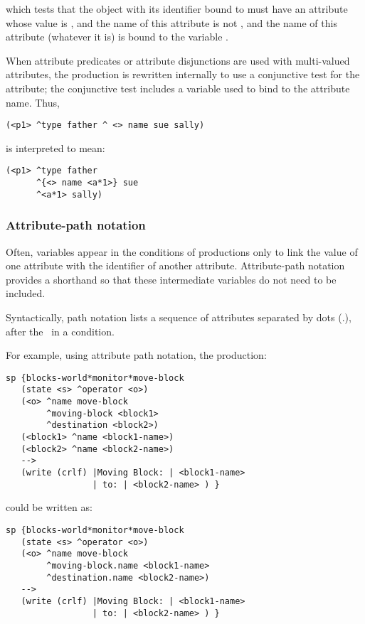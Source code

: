 which tests that the object with its identifier bound to  must have
an attribute whose value is , and the name of this attribute is
not , and the name of this attribute (whatever it is) is bound to
the variable .

When attribute predicates or attribute disjunctions are used with
multi-valued attributes, the production is rewritten internally to use a
conjunctive test for the attribute; the conjunctive test includes a
variable used to bind to the attribute name. Thus,

\begin{verbatim}
(<p1> ^type father ^ <> name sue sally)
\end{verbatim}

is interpreted to mean:

\begin{verbatim}
(<p1> ^type father 
      ^{<> name <a*1>} sue 
      ^<a*1> sally)
\end{verbatim}


\subsubsection{Attribute-path notation}
\label{SYNTAX-pm-path}

Often, variables appear in the conditions of productions only to link the value
of one attribute with the identifier of another attribute. Attribute-path
notation provides a shorthand so that these intermediate variables do not need
to be included.

Syntactically, path notation lists a sequence of attributes separated by dots
(.), after the \carat \ in a condition.

For example, using attribute path notation, the production:

\begin{verbatim}
sp {blocks-world*monitor*move-block
   (state <s> ^operator <o>)
   (<o> ^name move-block
        ^moving-block <block1>
        ^destination <block2>)
   (<block1> ^name <block1-name>)
   (<block2> ^name <block2-name>)   
   -->
   (write (crlf) |Moving Block: | <block1-name>
                 | to: | <block2-name> ) }
\end{verbatim}

could be written as:

\begin{verbatim}
sp {blocks-world*monitor*move-block
   (state <s> ^operator <o>)
   (<o> ^name move-block
        ^moving-block.name <block1-name>
        ^destination.name <block2-name>)   
   -->
   (write (crlf) |Moving Block: | <block1-name>
                 | to: | <block2-name> ) }
\end{verbatim}

